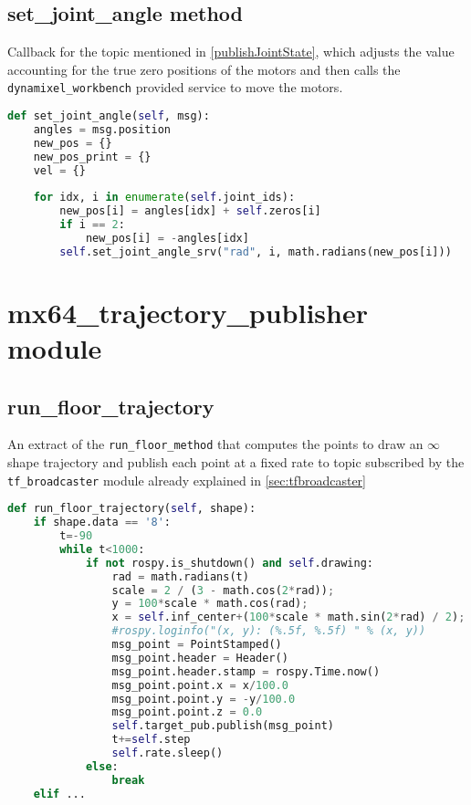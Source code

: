 \subsection*{set\_joint\_angle method}
Callback for the topic mentioned in \ref{publishJointState}, which adjusts the value accounting for the true zero positions of the motors and then calls the \texttt{dynamixel\_workbench} provided service to move the motors.
\begin{lstlisting}[caption={Set Joint Angle},label={lst:setjointangle},language=Python]
def set_joint_angle(self, msg):
    angles = msg.position
    new_pos = {}
    new_pos_print = {}
    vel = {}
    
    for idx, i in enumerate(self.joint_ids):
        new_pos[i] = angles[idx] + self.zeros[i]
        if i == 2:
            new_pos[i] = -angles[idx]
        self.set_joint_angle_srv("rad", i, math.radians(new_pos[i]))
\end{lstlisting}
\section*{mx64\_trajectory\_publisher module}
\subsection*{run\_floor\_trajectory}
An extract of the \texttt{run\_floor\_method} that computes the points to draw an $\infty$ shape trajectory and publish each point at a fixed rate to topic subscribed by the \texttt{tf\_broadcaster} module already explained in \ref{sec:tfbroadcaster}
\begin{lstlisting}[caption={Run $\infty$ Trajectory},label={lst:runfloortrajectory},language=Python]
def run_floor_trajectory(self, shape):
    if shape.data == '8':
        t=-90
        while t<1000:
            if not rospy.is_shutdown() and self.drawing:
                rad = math.radians(t)
                scale = 2 / (3 - math.cos(2*rad));
                y = 100*scale * math.cos(rad);
                x = self.inf_center+(100*scale * math.sin(2*rad) / 2);
                #rospy.loginfo("(x, y): (%.5f, %.5f) " % (x, y))
                msg_point = PointStamped()
                msg_point.header = Header()
                msg_point.header.stamp = rospy.Time.now()
                msg_point.point.x = x/100.0
                msg_point.point.y = -y/100.0
                msg_point.point.z = 0.0
                self.target_pub.publish(msg_point)
                t+=self.step
                self.rate.sleep()
            else:
                break
    elif ...
\end{lstlisting}
